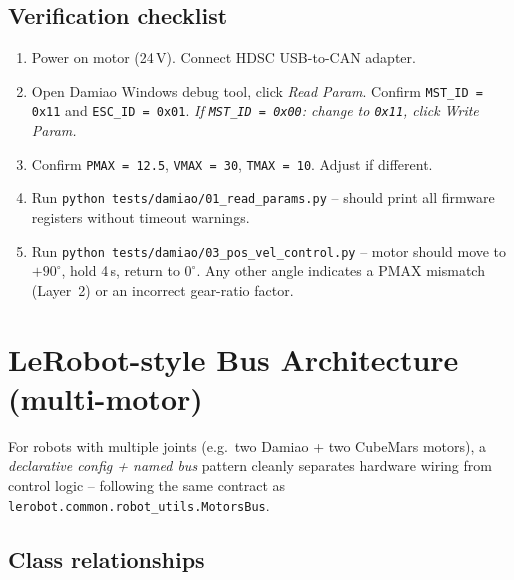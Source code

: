 \documentclass[11pt,a4paper]{article}
\begin{document}
\subsection{Verification checklist}
\begin{enumerate}
  \item Power on motor (24\,V).  Connect HDSC USB-to-CAN adapter.
  \item Open Damiao Windows debug tool, click \emph{Read Param}.
        Confirm \texttt{MST\_ID = 0x11} and \texttt{ESC\_ID = 0x01}.
        \textit{If \texttt{MST\_ID = 0x00}: change to \texttt{0x11}, click
        \emph{Write Param}.}
  \item Confirm \texttt{PMAX = 12.5}, \texttt{VMAX = 30},
        \texttt{TMAX = 10}.  Adjust if different.
  \item Run \texttt{python tests/damiao/01\_read\_params.py} -- should print all
        firmware registers without timeout warnings.
  \item Run \texttt{python tests/damiao/03\_pos\_vel\_control.py} -- motor should
        move to $+90^{\circ}$, hold 4\,s, return to $0^{\circ}$.
        Any other angle indicates a PMAX mismatch (Layer~2) or an
        incorrect gear-ratio factor.
\end{enumerate}

\section{LeRobot-style Bus Architecture (multi-motor)}
\label{sec:bus}

For robots with multiple joints (e.g.\ two Damiao + two CubeMars motors),
a \emph{declarative config + named bus} pattern cleanly separates hardware
wiring from control logic -- following the same contract as
\texttt{lerobot.common.robot\_utils.MotorsBus}.

\subsection{Class relationships}
\end{document}
